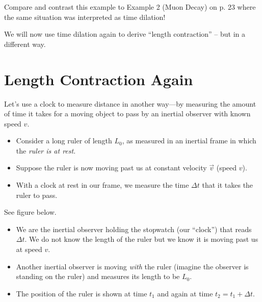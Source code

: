 \documentclass[11pt, letterpaper, openany]{book}
\begin{document}
Compare and contrast this example to Example 2 (Muon Decay) on p. 23 where the same situation was interpreted as time dilation!

We will now use time dilation again to derive ``length contraction'' -- but in a different way.


\section{Length Contraction Again}

Let's use a clock to measure distance in another way---by measuring the amount of time it takes for a moving object to pass by an inertial observer with known speed $v$.

\begin{itemize}
    \item Consider a long ruler of length $L_0$, as measured in an inertial frame in which the \textit{ruler is at rest}.
    \item Suppose the ruler is now moving past us at constant velocity $\vec{v}$ (speed $v$).
    \item With a clock at rest in our frame, we measure the time $\Delta t$ that it takes the ruler to pass.
\end{itemize}

See figure below.
\begin{itemize}
    \item We are the inertial observer holding the stopwatch (our ``clock'') that reads $\Delta t$. We do not know the length of the ruler but we know it is moving past us at speed $v$.
    \item Another inertial observer is moving \textit{with} the ruler (imagine the observer is standing on the ruler) and measures its length to be $L_0$.
    \item The position of the ruler is shown at time $t_1$ and again at time $t_2 = t_1 + \Delta t$.
\end{itemize}

\begin{center}
\end{center}
\end{document}
